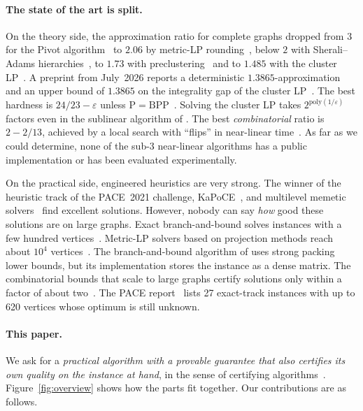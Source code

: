 \documentclass[11pt]{article}
\theoremstyle{definition}
\begin{document}
\paragraph{The state of the art is split.}  On the theory side, the
approximation ratio for complete graphs dropped from $3$ for the Pivot
algorithm~\citep{AilonCN08} to $2.06$ by metric-LP
rounding~\citep{ChawlaMSY15}, below $2$ with Sherali--Adams
hierarchies~\citep{CohenAddadLN22}, to $1.73$ with
preclustering~\citep{CohenAddadLLN23} and to $1.485$ with the cluster
LP~\citep{CaoCLLNV24}.  A preprint from July~2026 reports a deterministic
$1.3865$-approximation and an upper bound of $1.3865$ on the integrality gap
of the cluster LP~\citep{GarciaSorianoS26}.  The best hardness is
$24/23-\varepsilon$ unless $\mathrm{P}=\mathrm{BPP}$~\citep{CaoCLLNV24}.
Solving the cluster LP takes $2^{\mathrm{poly}(1/\varepsilon)}$ factors even in
the sublinear algorithm of \citet{CaoCLLLNTVYZ25}.  The best
\emph{combinatorial} ratio is $2-2/13$, achieved by a local search with
``flips'' in near-linear time~\citep{CohenAddadLPTYZ24}.  As far as we could
determine, none of the sub-$3$ near-linear algorithms has a public
implementation or has been evaluated experimentally.

On the practical side, engineered heuristics are very strong.  The winner of the
heuristic track of the PACE~2021 challenge, KaPoCE~\citep{BlasiusEtAl21kapoceHeur},
and multilevel memetic solvers~\citep{hausberger2025scc} find excellent
solutions.  However, nobody can say \emph{how} good these solutions are on
large graphs.  Exact branch-and-bound solves instances with a few hundred
vertices~\citep{BlasiusEtAl22sea}.  Metric-LP solvers based on projection
methods reach about $10^4$ vertices~\citep{veldt2019metric,ruggles2020parallel}.
The branch-and-bound algorithm of \citet{BlasiusEtAl22sea} uses strong
packing lower bounds, but its implementation stores the instance as a dense
matrix.  The combinatorial bounds that scale to large graphs certify
solutions only within a factor of about two~\citep{veldt2022stc}.  The PACE report~\citep{KellerhalsKNZ21pace}
lists 27 exact-track instances with up to 620 vertices whose optimum is
still unknown.

\paragraph{This paper.}  We ask for a \emph{practical algorithm with a
provable guarantee that also certifies its own quality on the instance at
hand}, in the sense of certifying algorithms~\citep{McConnellMNS11}.
Figure~\ref{fig:overview} shows how the parts fit together.  Our
contributions are as follows.
\end{document}
